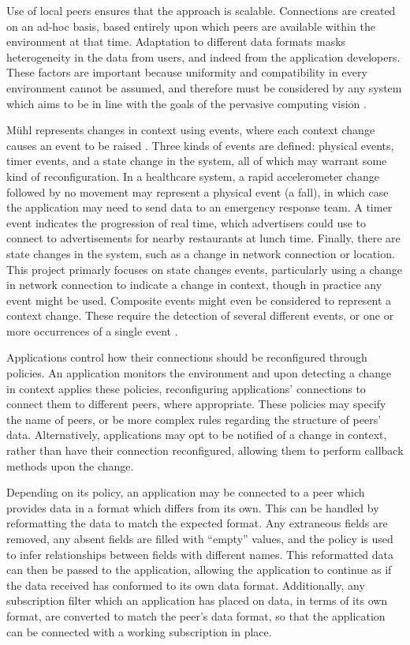 \documentclass[12pt,twoside,notitlepage]{report}
\begin{document}
Use of local peers ensures that the approach is scalable. 
Connections are created on an ad-hoc basis, based entirely upon which peers are available within the environment at that time. 
Adaptation to different data formats masks heterogeneity in the data \cite{saha2003pervasive} from users, and indeed from the application developers. 
These factors are important because uniformity and compatibility in every environment cannot be assumed, and therefore must be considered by any system which aims to be in line with the goals of the pervasive computing vision \cite{weiser1991computer}.

M\"{u}hl represents changes in context using events, where each context change causes an event to be raised \cite[p11]{muhl2006distributed}.
Three kinds of events are defined: physical events, timer events, and a state change in the system, all of which may warrant some kind of reconfiguration. 
In a healthcare system, a rapid accelerometer change followed by no movement may represent a physical event (a fall), in which case the application may need to send data to an emergency response team.
A timer event indicates the progression of real time, which advertisers could use to connect to advertisements for nearby restaurants at lunch time. 
Finally, there are state changes in the system, such as a change in network connection or location. 
This project primarly focuses on state changes events, particularly using a change in network connection to indicate a change in context, though in practice any event might be used.  
Composite events might even be considered to represent a context change. 
These require the detection of several different events, or one or more occurrences of a single event \cite{chakravarthy1994composite}. 

Applications control how their connections should be reconfigured through policies. 
An application monitors the environment and upon detecting a change in context applies these policies, reconfiguring applications' connections to connect them to different peers, where appropriate.
These policies may specify the name of peers, or be more complex rules regarding the structure of peers' data. 
Alternatively, applications may opt to be notified of a change in context, rather than have their connection reconfigured, allowing them to perform callback methods upon the change.

Depending on its policy, an application may be connected to a peer which provides data in a format which differs from its own.
This can be handled by reformatting the data to match the expected format. 
Any extraneous fields are removed, any absent fields are filled with ``empty'' values, and the policy is used to infer relationships between fields with different names. 
This reformatted data can then be passed to the application, allowing the application to continue as if the data received has conformed to its own data format. 
Additionally, any subscription filter which an application has placed on data, in terms of its own format, are converted to match the peer's data format, so that the application can be connected with a working subscription in place. 
\end{document}
